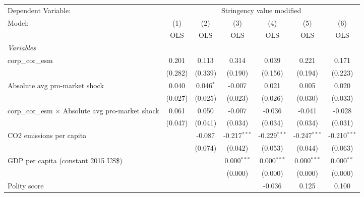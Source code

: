 
\begingroup
\centering
\begin{tabular}{lcccccc}
   \toprule
   Dependent Variable: & \multicolumn{6}{c}{Stringency value modified}\\
   Model:                                                   & (1)     & (2)         & (3)            & (4)            & (5)            & (6)\\  
                                                            &  OLS    & OLS         & OLS            & OLS            & OLS            & OLS\\  
   \midrule
   \emph{Variables}\\
   corp\_cor\_esm                                           & 0.201   & 0.113       & 0.314          & 0.039          & 0.221          & 0.171\\   
                                                            & (0.282) & (0.339)     & (0.190)        & (0.156)        & (0.194)        & (0.223)\\   
   Absolute avg pro-market shock                            & 0.040   & 0.046$^{*}$ & -0.007         & 0.021          & 0.005          & 0.020\\   
                                                            & (0.027) & (0.025)     & (0.023)        & (0.026)        & (0.030)        & (0.033)\\   
   corp\_cor\_esm $\times$ Absolute avg pro-market shock    & 0.061   & 0.050       & -0.007         & -0.036         & -0.041         & -0.028\\   
                                                            & (0.047) & (0.041)     & (0.034)        & (0.034)        & (0.034)        & (0.031)\\   
   CO2 emissions per capita                                 &         & -0.087      & -0.217$^{***}$ & -0.229$^{***}$ & -0.247$^{***}$ & -0.210$^{***}$\\   
                                                            &         & (0.074)     & (0.042)        & (0.053)        & (0.044)        & (0.063)\\   
   GDP per capita (constant 2015 US\$)                      &         &             & 0.000$^{***}$  & 0.000$^{***}$  & 0.000$^{***}$  & 0.000$^{**}$\\   
                                                            &         &             & (0.000)        & (0.000)        & (0.000)        & (0.000)\\   
   Polity score                                             &         &             &                & -0.036         & 0.125          & 0.100\\   

\end{tabular}
